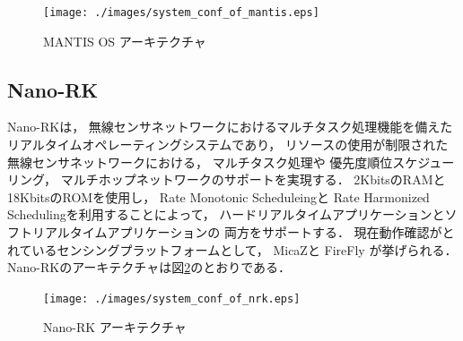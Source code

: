 \begin{figure}[htbp]
 \begin{center}
  \texttt{[image: ./images/system\_conf\_of\_mantis.eps]}
 \end{center}
 \caption{MANTIS OS アーキテクチャ}
 \label{fig:system_conf_of_mantis}
\end{figure}




\subsection{Nano-RK}
Nano-RK\cite{Eswaran:2005:NER:1106608.1106672}は，
無線センサネットワークにおけるマルチタスク処理機能を備えた
リアルタイムオペレーティングシステムであり，
リソースの使用が制限された無線センサネットワークにおける，
マルチタスク処理や
優先度順位スケジューリング，
マルチホップネットワークのサポートを実現する．
2KbitsのRAMと18KbitsのROMを使用し，
Rate Monotonic Scheduleing\cite{Liu:1973:SAM:321738.321743}と
Rate Harmonized Scheduling\cite{Rowe:2008:RSS:1475690.1475895}を利用することによって，
ハードリアルタイムアプリケーションとソフトリアルタイムアプリケーションの
両方をサポートする．
現在動作確認がとれているセンシングプラットフォームとして，
MicaZ\cite{Hill:2002:MWP:623308.624560}と
FireFly\cite{Rowe_firefly:a}
が挙げられる．
Nano-RKのアーキテクチャは図\ref{fig:system_conf_of_nrk}のとおりである．

\begin{figure}[htbp]
 \begin{center}
  \texttt{[image: ./images/system\_conf\_of\_nrk.eps]}
 \end{center}
 \caption{Nano-RK アーキテクチャ}
 \label{fig:system_conf_of_nrk}
\end{figure}






